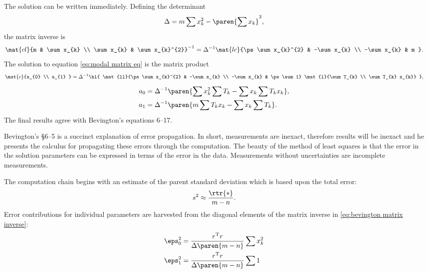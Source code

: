 The solution can be written immediately. Defining the determinant
  \begin{equation}   %
    \Delta = m \sum x_{k}^{2} - \paren{\sum x_{k}}^{2},
    \label{eq:det}
  \end{equation}
the matrix inverse is
  \begin{equation}   %
    \mat{cl}{m & \sum x_{k} \\ \sum x_{k} & \sum x_{k}^{2}}^{-1} = \Delta^{-1} 
    \mat{lc}{\ps \sum x_{k}^{2} & -\sum x_{k} \\ -\sum x_{k} & m } .
    \label{eq:bevington matrix inverse}
  \end{equation}
The solution to equation \eqref{eq:modal matrix eq} is the matrix product
  \begin{equation*}
    \mat{c}{a_{0} \\ a_{1} } = \Delta^{-1}
    \bl{
    \mat{ll}{\ps \sum x_{k}^{2} & -\sum x_{k} \\ -\sum x_{k} & \ps \sum 1}
    \mat{l}{\sum T_{k} \\ \sum T_{k} x_{k}}
    },
    \label{eqn:bevington solution product}
  \end{equation*}
  \begin{equation}
  \begin{split}
    a_{0} &= \Delta^{-1} \paren{\sum x_{k}^{2}\sum T_{k} - \sum x_{k}\sum T_{k} x_{k}}, \\
    a_{1} &= \Delta^{-1} \paren{m \sum T_{k} x_{k} - \sum x_{k}\sum T_{k}}.
  \label{eqn:bevington soln sum}
  \end{split}
  \end{equation}
The final results agree with Bevington's equations 6--17.

Bevington's \S 6--5 is a succinct explanation of error propagation. In short, measurements are inexact, therefore results will be inexact and he presents the calculus for propagating these errors through the computation. The beauty of the method of least squares is that the error in the solution parameters can be expressed in terms of the error in the data. Measurements without uncertainties are incomplete measurements.

The computation chain begins with an estimate of the parent standard deviation which is based upon the total error:
  \begin{equation*}
    s^{2} \approx \frac{\rtr{*}} {m-n}.
  \end{equation*}
Error contributions for individual parameters are harvested from the diagonal elements of the matrix inverse in \eqref{eq:bevington matrix inverse}:
\begin{equation*}
  \begin{split}
    \eps_{0}^{2} &= \frac{r^{\mathrm{T}}r}{\Delta\paren{m-n}} \sum x_{k}^{2} \\
    \eps_{1}^{2} &= \frac{r^{\mathrm{T}}r}{\Delta\paren{m-n}} \sum 1 \\
  \end{split}
  \label{eqn:bevington error terms}
\end{equation*}
  
